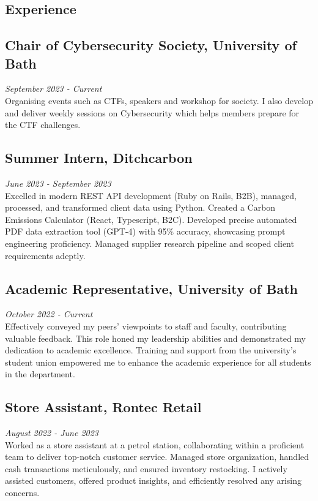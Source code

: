 \documentclass[11pt,a4paper,sans]{moderncv}        %
\begin{document}
\begin{multicols}{2}
\closesection


\section{Experience}
\subsection{Chair of Cybersecurity Society, University of Bath}
\textit{September 2023 - Current}\\
Organising events such as CTFs, speakers and workshop for society. I also develop and deliver weekly sessions on Cybersecurity which helps members prepare for the  CTF challenges.
\vspace{5pt}
\subsection{Summer Intern, Ditchcarbon}
\textit{June 2023 - September 2023}\\
Excelled in modern REST API development (Ruby on Rails, B2B), managed, processed, and transformed client data using Python. Created a Carbon Emissions Calculator (React, Typescript, B2C). Developed precise automated PDF data extraction tool (GPT-4) with 95\% accuracy, showcasing prompt engineering proficiency. Managed supplier research pipeline and scoped client requirements adeptly.
\vspace{5pt}
\subsection{Academic Representative, University of Bath}
\textit{October 2022 - Current}\\
Effectively conveyed my peers' viewpoints to staff and faculty, contributing valuable feedback. This role honed my leadership abilities and demonstrated my dedication to academic excellence. Training and support from the university's student union empowered me to enhance the academic experience for all students in the department.
\vspace{5pt}
\subsection{Store Assistant, Rontec Retail}
\textit{August 2022 - June 2023}\\
Worked as a store assistant at a petrol station, collaborating within a proficient team to deliver top-notch customer service. Managed store organization, handled cash transactions meticulously, and ensured inventory restocking. I actively assisted customers, offered product insights, and efficiently resolved any arising concerns.
\vspace{5pt}

\end{multicols}
\end{document}
